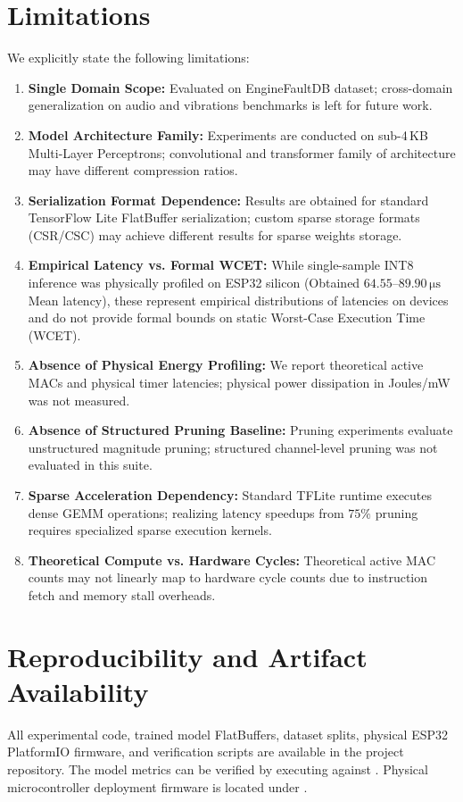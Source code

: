\documentclass[journal,10pt]{IEEEtran}
\begin{document}
\section{Limitations}
We explicitly state the following limitations:
\begin{enumerate}
    \item \textbf{Single Domain Scope:} Evaluated on EngineFaultDB dataset; cross-domain generalization on audio and vibrations benchmarks is left for future work.
    \item \textbf{Model Architecture Family:} Experiments are conducted on sub-4\,KB Multi-Layer Perceptrons; convolutional and transformer family of architecture may have different compression ratios.
    \item \textbf{Serialization Format Dependence:} Results are obtained for standard TensorFlow Lite FlatBuffer serialization; custom sparse storage formats (CSR/CSC) may achieve different results for sparse weights storage.
    \item \textbf{Empirical Latency vs. Formal WCET:} While single-sample INT8 inference was physically profiled on ESP32 silicon (Obtained $64.55\text{--}89.90\,\si{\micro\second}$ Mean latency), these represent empirical distributions of latencies on devices and do not provide formal bounds on static Worst-Case Execution Time (WCET).
    \item \textbf{Absence of Physical Energy Profiling:} We report theoretical active MACs and physical timer latencies; physical power dissipation in Joules/mW was not measured.
    \item \textbf{Absence of Structured Pruning Baseline:} Pruning experiments evaluate unstructured magnitude pruning; structured channel-level pruning was not evaluated in this suite.
    \item \textbf{Sparse Acceleration Dependency:} Standard TFLite runtime executes dense GEMM operations; realizing latency speedups from $75\%$ pruning requires specialized sparse execution kernels.
    \item \textbf{Theoretical Compute vs. Hardware Cycles:} Theoretical active MAC counts may not linearly map to hardware cycle counts due to instruction fetch and memory stall overheads.
\end{enumerate}

\section{Reproducibility and Artifact Availability}
All experimental code, trained model FlatBuffers, dataset splits, physical ESP32 PlatformIO firmware, and verification scripts are available in the project repository. The model metrics can be verified by executing  against . Physical microcontroller deployment firmware is located under .
\end{document}
